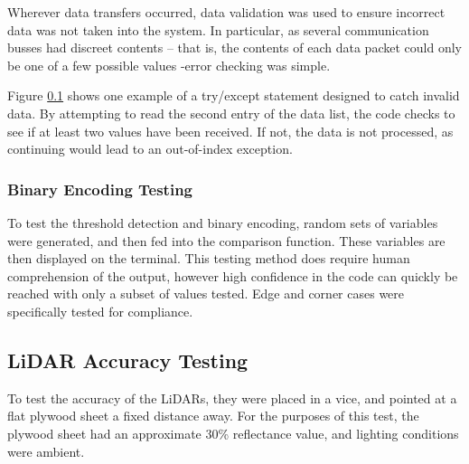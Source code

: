 \documentclass [12pt]{article}
\begin{document}
	Wherever data transfers occurred, data validation was used to ensure incorrect data was not taken into the system. In particular, as several communication busses had discreet contents – that is, the contents of each data packet could only be one of a few possible values -error checking was simple.  

Figure \ref{} shows one example of a try/except statement designed to catch invalid data. By attempting to read the second entry of the data list, the code checks to see if at least two values have been received. If not, the data is not processed, as continuing would lead to an out-of-index exception. 

\subsubsection{Binary Encoding Testing}
To test the threshold detection and binary encoding, random sets of variables were generated, and then fed into the comparison function. These variables are then displayed on the terminal. This testing method does require human comprehension of the output, however high confidence in the code can quickly be reached with only a subset of values tested. Edge and corner cases were specifically tested for compliance.

\subsection{LiDAR Accuracy Testing}
To test the accuracy of the LiDARs, they were placed in a vice, and pointed at a flat plywood sheet a fixed distance away. For the purposes of this test, the plywood sheet had an approximate 30\% reflectance value, and lighting conditions were ambient.
\end{document}
